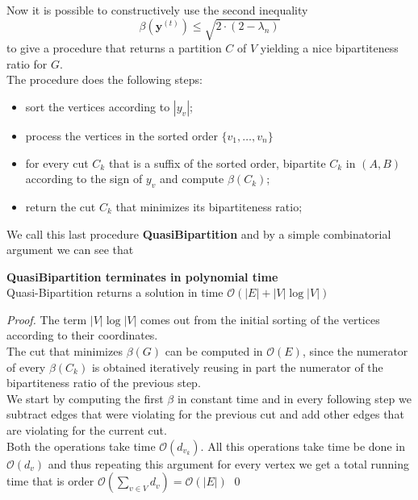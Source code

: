 Now it is possible to constructively use the second inequality
\[ \beta(\mathbf{y}^{(t)}) \leq  \sqrt{2 \cdot (2-\lambda_n)}\]
to give a procedure that returns a partition $ C $ of $ V $ yielding a nice bipartiteness ratio for $ G $.\\
The procedure does the following steps:
\begin{itemize}
\item sort the vertices according to $ |y_v| $;
\item process the vertices in the sorted order $ \{v_1, \dots, v_n \} $
\item for every cut $ C_k $ that is a suffix of the sorted order, bipartite $ C_k $ in $ (A,B) $ according to the sign of $ y_v $ and compute $ \beta(C_k) $;
\item return the cut $ C_k $ that minimizes its bipartiteness ratio;

\end{itemize}

We call this last procedure \textbf{QuasiBipartition} and by a simple combinatorial argument we can see that

\begin{proposition}{\textbf{QuasiBipartition terminates in polynomial time}} \\
Quasi-Bipartition returns a solution in time $ \mathcal{O}(|E| + |V| \log |V|) $
\begin{proof}
The term $  |V| \log |V| $ comes out from the initial sorting of the vertices according to their coordinates. \\
The cut that minimizes $ \beta(G) $ can be computed in $ \mathcal{O}(E) $, since the numerator of every $ \beta(C_k) $ is obtained iteratively reusing in part the numerator of the bipartiteness ratio of the previous step. \\
We start by computing the first $ \beta $ in constant time and in every following step we subtract edges that were violating for the previous cut and add other edges that are violating for the current cut. \\
Both the operations take time $ \mathcal{O}(d_{v_k}) $. 
All this operations take time  be done in $ \mathcal{O}(d_v) $ and thus repeating this argument for every vertex we get a total running time that is order $ \mathcal{O}(\sum_{v \in V} d_v) = \mathcal{O}(|E|) $ 
\qed
\end{proof}
\end{proposition}



